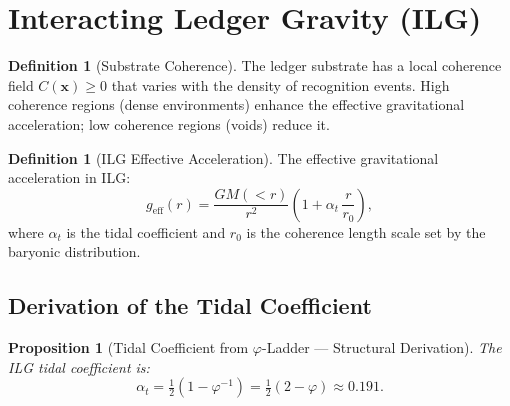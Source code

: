 \documentclass[12pt,a4paper]{article}
\newtheorem{proposition}[theorem]{Proposition}
\theoremstyle{definition}
\newtheorem{definition}[theorem]{Definition}
\theoremstyle{remark}
\begin{document}
\section{Interacting Ledger Gravity (ILG)}
\label{sec:ilg}

\begin{definition}[Substrate Coherence]
\label{def:coherence}
The ledger substrate has a local coherence field
$C(\mathbf{x}) \geq 0$ that varies with the density of
recognition events.  High coherence regions (dense
environments) enhance the effective gravitational
acceleration; low coherence regions (voids) reduce it.
\end{definition}

\begin{definition}[ILG Effective Acceleration]
\label{def:ilg}
The effective gravitational acceleration in ILG:
\begin{equation}
  g_{\mathrm{eff}}(r) = \frac{GM(<r)}{r^2}
  \left(1 + \alpha_t\,\frac{r}{r_0}\right),
  \label{eq:ilg}
\end{equation}
where $\alpha_t$ is the tidal coefficient and $r_0$ is the
coherence length scale set by the baryonic distribution.
\end{definition}

\subsection{Derivation of the Tidal Coefficient}

\begin{proposition}[Tidal Coefficient from $\varphi$-Ladder --- Structural Derivation]
\label{thm:tidal}
The ILG tidal coefficient is:
\begin{equation}
  \boxed{\alpha_t = \tfrac{1}{2}(1 - \varphi^{-1})
  = \tfrac{1}{2}(2 - \varphi) \approx 0.191.}
  \label{eq:alpha-t}
\end{equation}
\end{proposition}
\end{document}
